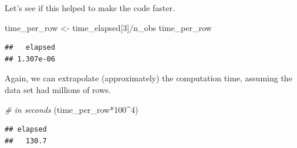 \documentclass[
  12pt,
]{style/krantz}
\newenvironment{Shaded}{\begin{snugshade}}{\end{snugshade}}
\newcommand{\CommentTok}[1]{\textcolor[rgb]{0.56,0.35,0.01}{\textit{#1}}}
\newcommand{\ConstantTok}[1]{\textcolor[rgb]{0.00,0.00,0.00}{#1}}
\newcommand{\ControlFlowTok}[1]{\textcolor[rgb]{0.13,0.29,0.53}{\textbf{#1}}}
\newcommand{\DecValTok}[1]{\textcolor[rgb]{0.00,0.00,0.81}{#1}}
\newcommand{\FloatTok}[1]{\textcolor[rgb]{0.00,0.00,0.81}{#1}}
\newcommand{\FunctionTok}[1]{\textcolor[rgb]{0.00,0.00,0.00}{#1}}
\newcommand{\NormalTok}[1]{#1}
\newcommand{\OtherTok}[1]{\textcolor[rgb]{0.56,0.35,0.01}{#1}}
\newcommand{\SpecialCharTok}[1]{\textcolor[rgb]{0.00,0.00,0.00}{#1}}
\begin{document}
\begin{Shaded}
\end{Shaded}

Let's see if this helped to make the code faster.

\begin{Shaded}
\begin{Highlighting}[]
\NormalTok{time\_per\_row }\OtherTok{\textless{}{-}}\NormalTok{ time\_elapsed[}\DecValTok{3}\NormalTok{]}\SpecialCharTok{/}\NormalTok{n\_obs}
\NormalTok{time\_per\_row}
\end{Highlighting}
\end{Shaded}

\begin{verbatim}
##   elapsed 
## 1.307e-06
\end{verbatim}

Again, we can extrapolate (approximately) the computation time, assuming the data set had millions of rows.

\begin{Shaded}
\begin{Highlighting}[]
\CommentTok{\# in seconds}
\NormalTok{(time\_per\_row}\SpecialCharTok{*}\DecValTok{100}\SpecialCharTok{\^{}}\DecValTok{4}\NormalTok{) }
\end{Highlighting}
\end{Shaded}

\begin{verbatim}
## elapsed 
##   130.7
\end{verbatim}
\end{document}
